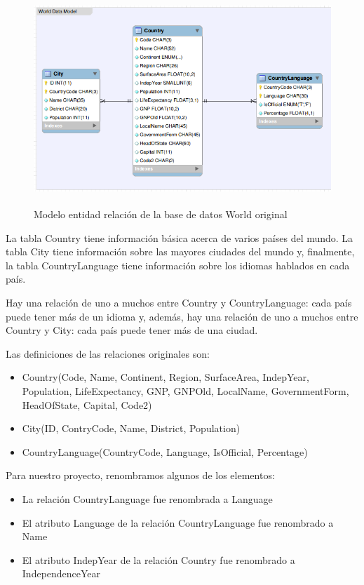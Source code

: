 \begin{figure}
  \centering
    \includegraphics[width=12.823cm,height=8.004cm]{graficos/fuentes/world-db.png}
  \caption{Modelo entidad relación de la base de datos World original}
  \label{fig:world-db}
\end{figure}

La tabla Country tiene información básica acerca de varios países del mundo. La tabla City tiene información sobre las mayores ciudades del mundo y, finalmente, la tabla CountryLanguage tiene información sobre los idiomas hablados en cada país.

Hay una relación de uno a muchos entre Country y CountryLanguage: cada país puede tener más de un idioma y, además, hay una relación de uno a muchos entre Country y City: cada país puede tener más de una ciudad.

\medskip
Las definiciones de las relaciones originales son:
\begin{itemize}
\item Country(Code, Name, Continent, Region, SurfaceArea, IndepYear, Population, LifeExpectancy, GNP, GNPOld, LocalName, GovernmentForm, HeadOfState, Capital, Code2)
\item City(ID, ContryCode, Name, District, Population)
\item CountryLanguage(CountryCode, Language, IsOfficial, Percentage)
\end{itemize}

Para nuestro proyecto, renombramos algunos de los elementos:
\begin{itemize}
\item La relación CountryLanguage fue renombrada a Language
\item El atributo Language de la relación CountryLanguage fue renombrado a Name
\item El atributo IndepYear de la relación Country fue renombrado a IndependenceYear
\end{itemize}

